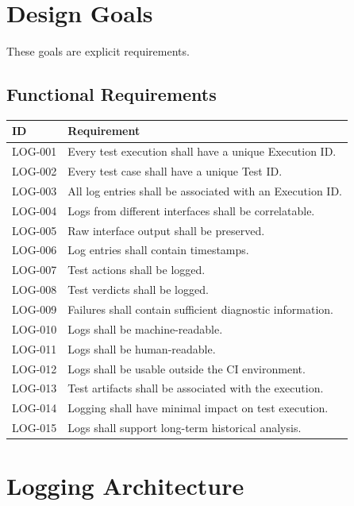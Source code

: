 \documentclass[
  11pt,
  letterpaper,
  DIV=11,
  numbers=noendperiod]{scrartcl}
\newcounter{none} %
\begin{document}
\section{Design Goals}\label{design-goals}

These goals are explicit requirements.

\subsection{Functional Requirements}\label{functional-requirements}

{\def\LTcaptype{none} %
\begin{longtable}[]{@{}ll@{}}
\toprule\noalign{}
ID & Requirement \\
\midrule\noalign{}
\endhead
\bottomrule\noalign{}
\endlastfoot
LOG-001 & Every test execution shall have a unique Execution ID. \\
LOG-002 & Every test case shall have a unique Test ID. \\
LOG-003 & All log entries shall be associated with an Execution ID. \\
LOG-004 & Logs from different interfaces shall be correlatable. \\
LOG-005 & Raw interface output shall be preserved. \\
LOG-006 & Log entries shall contain timestamps. \\
LOG-007 & Test actions shall be logged. \\
LOG-008 & Test verdicts shall be logged. \\
LOG-009 & Failures shall contain sufficient diagnostic information. \\
LOG-010 & Logs shall be machine-readable. \\
LOG-011 & Logs shall be human-readable. \\
LOG-012 & Logs shall be usable outside the CI environment. \\
LOG-013 & Test artifacts shall be associated with the execution. \\
LOG-014 & Logging shall have minimal impact on test execution. \\
LOG-015 & Logs shall support long-term historical analysis. \\
\end{longtable}
}

\section{Logging Architecture}\label{logging-architecture}
\end{document}
